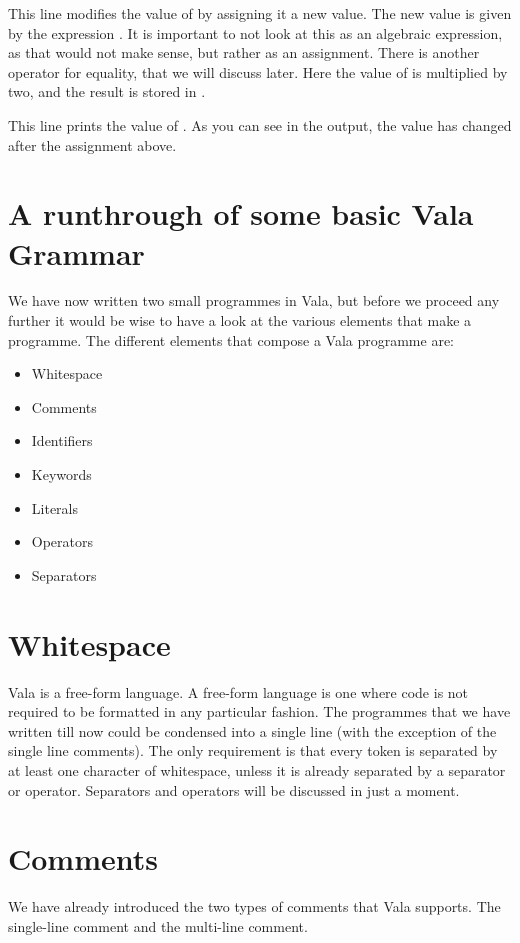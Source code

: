 
This line modifies the value of  by assigning it a new value. The new value is given by the expression . It is important to not look at this as an algebraic expression, as that would not make sense, but rather as an assignment. There is another operator for equality, that we will discuss later. Here the value of  is multiplied by two, and the result is stored in .


This line prints the value of . As you can see in the output, the value has changed after the assignment above.

\section{A runthrough of some basic Vala Grammar}
We have now written two small programmes in Vala, but before we proceed any further it would be wise to have a look at the various elements that make a programme. The different elements that compose a Vala programme are:

\begin{itemize}
\item Whitespace
\item Comments
\item Identifiers
\item Keywords
\item Literals
\item Operators
\item Separators
\end{itemize}

\section{Whitespace}
Vala is a free-form language. A free-form language is one where code is not required to be formatted in any particular fashion. The programmes that we have written till now could be condensed into a single line (with the exception of the single line comments). The only requirement is that every token is separated by at least one character of whitespace, unless it is already separated by a separator or operator. Separators and operators will be discussed in just a moment.

\section{Comments}
We have already introduced the two types of comments that Vala supports. The single-line comment and the multi-line comment.

